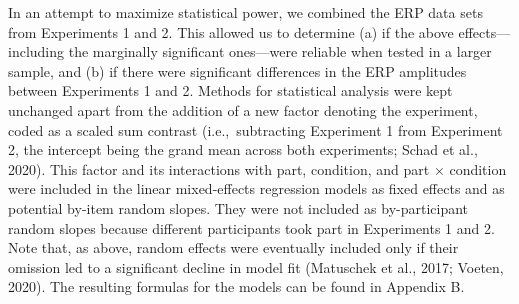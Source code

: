 \documentclass[
  english,
  doc,12pt,twoside,floatsintext]{apa7}
\begin{document}
In an attempt to maximize statistical power, we combined the ERP data sets from Experiments 1 and 2. This allowed us to determine (a) if the above effects---including the marginally significant ones---were reliable when tested in a larger sample, and (b) if there were significant differences in the ERP amplitudes between Experiments 1 and 2. Methods for statistical analysis were kept unchanged apart from the addition of a new factor denoting the experiment, coded as a scaled sum contrast (i.e.,~subtracting Experiment 1 from Experiment 2, the intercept being the grand mean across both experiments; Schad et al., 2020). This factor and its interactions with part, condition, and part × condition were included in the linear mixed-effects regression models as fixed effects and as potential by-item random slopes. They were not included as by-participant random slopes because different participants took part in Experiments 1 and 2. Note that, as above, random effects were eventually included only if their omission led to a significant decline in model fit (Matuschek et al., 2017; Voeten, 2020). The resulting formulas for the models can be found in Appendix B.
\end{document}
